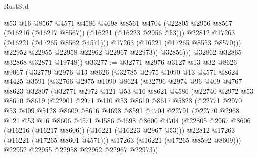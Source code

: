 \begin{lexlean}{RustStd}
\begin{coremodule}
                      @53
                      @16
                      @8567
                      @4571
                      @4586
                      @4698
                      @8561
                      @4704
                      (@22805 @2956 @8567 (@16216 (@16217 @8567)) (@16221 (@16223 @2956 @53)))
                      @22812
                      @17263
                      (@16221 (@17265 @8562 @4571)))
                    @17263
                    (@16221 (@17265 @8553 @8570)))
                  @22952
                  @22955
                  @22958
                  @22962
                  @22967
                  @22973))
              @32856)))
        @32862
        @32865
        @32868
        @32871
        @19748))
@33277 := @32771
    @2976
    @3127
    @13
    @32
    @8626
    @9067
    (@32779
      @2976
      @13
      @8626
      (@32785
        @2975
        @1090
        @13
        @4571
        @8624
        @4425
        @3591
        (@32766
          @2975
          @1090
          @8624
          (@32796
            @2974
            @96
            @409
            @4767
            @8623
            @32807
            (@32771
              @2972
              @121
              @53
              @16
              @8621
              @4586
              (@22740
                @2972
                @53
                @8610
                @8619
                (@22901
                  @2971
                  @410
                  @53
                  @8610
                  @8617
                  @5828
                  (@22771
                    @2970
                    @53
                    @409
                    @5128
                    @8609
                    @8616
                    @4698
                    @8591
                    @4704
                    @22791
                    (@22770
                      @2968
                      @121
                      @53
                      @16
                      @8606
                      @4571
                      @4586
                      @4698
                      @8600
                      @4704
                      (@22805 @2967 @8606 (@16216 (@16217 @8606)) (@16221 (@16223 @2967 @53)))
                      @22812
                      @17263
                      (@16221 (@17265 @8601 @4571)))
                    @17263
                    (@16221 (@17265 @8592 @8609)))
                  @22952
                  @22955
                  @22958
                  @22962
                  @22967
                  @22973))

\end{coremodule}
\end{lexlean}
